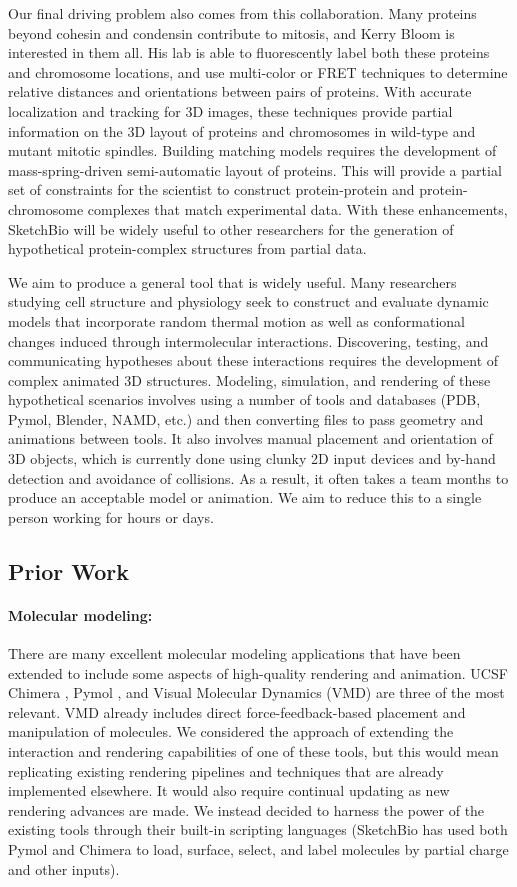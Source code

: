 \documentclass[twocolumn]{bmcart}%
\begin{document}
Our final driving problem also comes from this collaboration.  Many proteins beyond cohesin and condensin contribute to mitosis, and Kerry Bloom is interested in them all.  His lab is able to fluorescently label both these proteins and chromosome locations, and use multi-color or FRET techniques to determine relative distances and orientations between pairs of proteins.  With accurate localization and tracking for 3D images, these techniques provide partial information on the 3D layout of proteins and chromosomes in wild-type and mutant mitotic spindles.  Building matching models requires the development of mass-spring-driven semi-automatic layout of proteins.  This will provide a partial set of constraints for the scientist to construct protein-protein and protein-chromosome complexes that match experimental data.  With these enhancements, SketchBio will be widely useful to other researchers for the generation of hypothetical protein-complex structures from partial data.

We aim to produce a general tool that is widely useful.  Many researchers studying cell structure and physiology seek to construct
and evaluate dynamic models that incorporate random thermal motion as
well as conformational changes induced through intermolecular interactions.
Discovering, testing, and communicating hypotheses about these
interactions requires the development of complex animated 3D structures. Modeling, simulation, and rendering
of these hypothetical scenarios involves using a number of tools and databases (PDB, Pymol, Blender, NAMD, etc.)
and then converting files to pass geometry and animations between tools. It also involves
manual placement and orientation of 3D objects, which is currently done using clunky 2D input devices and by-hand
detection and avoidance of collisions. As a result, it often takes a team months to produce an acceptable
model or animation. We aim to reduce this to a single person working for hours or days.

\subsection*{Prior Work}
\paragraph*{Molecular modeling:}
There are many excellent molecular modeling applications that have been extended to include some aspects of high-quality rendering and animation.  UCSF Chimera \cite{pettersen2004ucsf}, Pymol \cite{pymol2013}, and Visual Molecular Dynamics (VMD) \cite{humphrey1996} are three of the most relevant.  VMD already includes direct force-feedback-based placement and manipulation of molecules.  We considered the approach of extending the interaction and rendering capabilities of one of these tools, but this would mean replicating existing rendering pipelines and techniques that are already implemented elsewhere.  It would also require continual updating as new rendering advances are made.  We instead decided to harness the power of the existing tools through their built-in scripting languages (SketchBio has used both Pymol and Chimera to load, surface, select, and label molecules by partial charge and other inputs).
\end{document}

